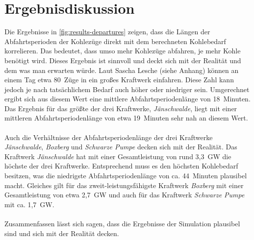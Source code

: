 \section{Ergebnisdiskussion}

Die Ergebnisse in \autoref{fig:results-departures} zeigen, dass die Längen der Abfahrtsperioden der Kohlezüge direkt mit dem berechneten Kohlebedarf korrelieren. Das bedeutet, dass umso mehr Kohlezüge abfahren, je mehr Kohle benötigt wird. Dieses Ergebnis ist sinnvoll und deckt sich mit der Realität und dem was man erwarten würde. Laut Sascha Lesche (siehe Anhang) können an einem Tag etwa 80~Züge in ein großes Kraftwerk einfahren. Diese Zahl kann jedoch je nach tatsächlichem Bedarf auch höher oder niedriger sein. Umgerechnet ergibt sich aus diesem Wert eine mittlere Abfahrtsperiodenlänge von 18~Minuten. Das Ergebnis für das größte der drei Kraftwerke, \emph{Jänschwalde}, liegt mit einer mittleren Abfahrtsperiodenlänge von etwa 19~Minuten sehr nah an diesem Wert. \\
\\
Auch die Verhältnisse der Abfahrtsperiodenlänge der drei Kraftwerke \emph{Jänschwalde}, \emph{Boxberg} und \emph{Schwarze Pumpe} decken sich mit der Realität. Das Kraftwerk \emph{Jänschwalde} hat mit einer Gesamtleistung von rund 3,3~GW die höchste der drei Kraftwerke. Entsprechend muss es den höchsten Kohlebedarf besitzen, was die niedrigste Abfahrtsperiodenlänge von ca. 44~Minuten plausibel macht. Gleiches gilt für das zweit-leistungsfähigste Kraftwerk \emph{Boxberg} mit einer Gesamtleistung von etwa 2,7~GW und auch für das Kraftwerk \emph{Schwarze Pumpe} mit ca. 1,7~GW. \cite{noauthor_bundesnetzagentur_nodate}\\
\\
Zusammenfassen lässt sich sagen, dass die Ergebnisse der Simulation plausibel sind und sich mit der Realität decken.